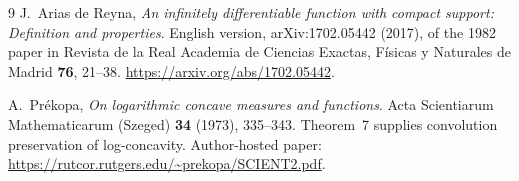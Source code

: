 \documentclass[11pt,a4paper]{article}
\numberwithin{equation}{section}
\theoremstyle{definition}
\theoremstyle{remark}
\begin{document}
\begin{thebibliography}{9}
J.~Arias de Reyna,
\emph{An infinitely differentiable function with compact support:
Definition and properties}.
English version, arXiv:1702.05442 (2017), of the 1982 paper in
Revista de la Real Academia de Ciencias Exactas, F\'isicas y Naturales
de Madrid \textbf{76}, 21--38.
\newblock\url{https://arxiv.org/abs/1702.05442}.

A.~Pr\'ekopa,
\emph{On logarithmic concave measures and functions}.
Acta Scientiarum Mathematicarum (Szeged) \textbf{34} (1973), 335--343.
\newblock Theorem~7 supplies convolution preservation of log-concavity.
Author-hosted paper:
\url{https://rutcor.rutgers.edu/~prekopa/SCIENT2.pdf}.

\end{thebibliography}
\end{document}
